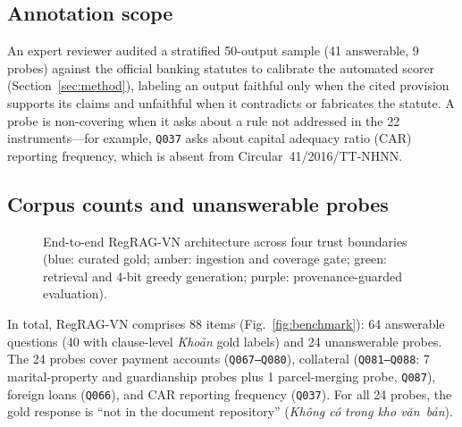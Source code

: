 \documentclass[conference,a4paper]{IEEEtran}
\begin{document}
\subsection{Annotation scope}
An expert reviewer audited a stratified 50-output sample (41 answerable, 9 probes) against the official banking statutes to calibrate the automated scorer (Section~\ref{sec:method}), labeling an output faithful only when the cited provision supports its claims and unfaithful when it contradicts or fabricates the statute. A probe is non-covering when it asks about a rule not addressed in the 22 instruments---for example, \texttt{Q037} asks about capital adequacy ratio (CAR) reporting frequency, which is absent from Circular~41/2016/TT-NHNN.

\subsection{Corpus counts and unanswerable probes}
\begin{figure}[t]
\centering
{}
\caption{End-to-end RegRAG-VN architecture across four trust boundaries (blue: curated gold; amber: ingestion and coverage gate; green: retrieval and 4-bit greedy generation; purple: provenance-guarded evaluation).}
\label{fig:pipeline}
\end{figure}
In total, RegRAG-VN comprises 88 items (Fig.~\ref{fig:benchmark}): 64 answerable questions (40 with clause-level \emph{Khoản} gold labels) and 24 unanswerable probes. The 24 probes cover payment accounts (\texttt{Q067--Q080}), collateral (\texttt{Q081--Q088}: 7 marital-property and guardianship probes plus 1 parcel-merging probe, \texttt{Q087}), foreign loans (\texttt{Q066}), and CAR reporting frequency (\texttt{Q037}). For all 24 probes, the gold response is ``not in the document repository'' (\emph{Không có trong kho văn~bản}).
\end{document}
